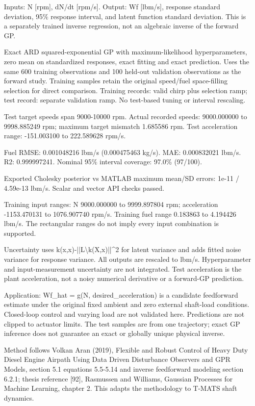 Inputs: N [rpm], dN/dt [rpm/s]. Output: Wf [lbm/s], response standard deviation, 95\% response interval, and latent function standard deviation. This is a separately trained inverse regression, not an algebraic inverse of the forward GP.

Exact ARD squared-exponential GP with maximum-likelihood hyperparameters, zero mean on standardized responses, exact fitting and exact prediction. Uses the same 600 training observations and 100 held-out validation observations as the forward study. Training samples retain the original speed/fuel space-filling selection for direct comparison. Training records: valid chirp plus selection ramp; test record: separate validation ramp. No test-based tuning or interval rescaling.

Test target speeds span 9000-10000 rpm. Actual recorded speeds: 9000.000000 to 9998.885249 rpm; maximum target mismatch 1.685586 rpm. Test acceleration range: -151.003100 to 222.589628 rpm/s.

Fuel RMSE: 0.001048216 lbm/s (0.000475463 kg/s). MAE: 0.000832021 lbm/s. R2: 0.999997241. Nominal 95\% interval coverage: 97.0\% (97/100).

Exported Cholesky posterior vs MATLAB maximum mean/SD errors: 1e-11 / 4.59e-13 lbm/s. Scalar and vector API checks passed.

Training input ranges: N 9000.000000 to 9999.897804 rpm; acceleration -1153.470131 to 1076.907740 rpm/s. Training fuel range 0.183863 to 4.194426 lbm/s. The rectangular ranges do not imply every input combination is supported.

Uncertainty uses k(x,x)-||L\textbackslash{}k(X,x)||\textasciicircum{}2 for latent variance and adds fitted noise variance for response variance. All outputs are rescaled to lbm/s. Hyperparameter and input-measurement uncertainty are not integrated. Test acceleration is the plant acceleration, not a noisy numerical derivative or a forward-GP prediction.

Application: Wf\_\allowbreak hat = g(N, desired\_\allowbreak acceleration) is a candidate feedforward estimate under the original fixed ambient and zero external shaft-load conditions. Closed-loop control and varying load are not validated here. Predictions are not clipped to actuator limits. The test samples are from one trajectory; exact GP inference does not guarantee an exact or globally unique physical inverse.

Method follows Volkan Aran (2019), Flexible and Robust Control of Heavy Duty Diesel Engine Airpath Using Data Driven Disturbance Observers and GPR Models, section 5.1 equations 5.5-5.14 and inverse feedforward modeling section 6.2.1; thesis reference [92], Rasmussen and Williams, Gaussian Processes for Machine Learning, chapter 2. This adapts the methodology to T-MATS shaft dynamics.

